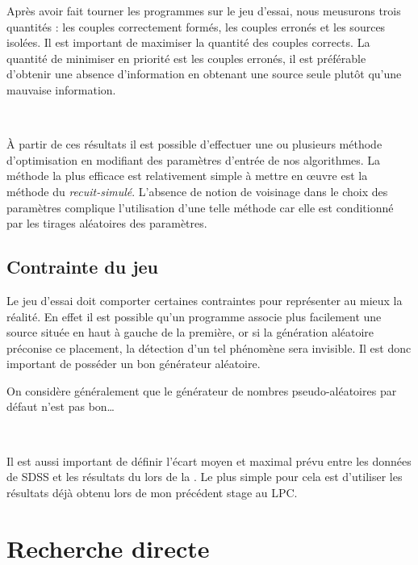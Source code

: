 Après avoir fait tourner les programmes sur le jeu d'essai, nous meusurons trois quantités : les couples correctement formés, les couples erronés et les sources isolées. Il est important de maximiser la quantité des couples corrects. La quantité de minimiser en priorité est les couples erronés, il est préférable d'obtenir une absence d'information en obtenant une source seule plutôt qu'une mauvaise information.

\ 

À partir de ces résultats il est possible d'effectuer une ou plusieurs méthode d'optimisation en modifiant des paramètres d'entrée de nos algorithmes. La méthode la plus efficace est relativement simple à mettre en \oe{}uvre est la méthode du \emph{recuit-simulé}. L'absence de notion de voisinage dans le choix des paramètres complique l'utilisation d'une telle méthode car elle est conditionné par les tirages aléatoires des paramètres.

	\subsection{Contrainte du jeu}

Le jeu d'essai doit comporter certaines contraintes pour représenter au mieux la réalité. En effet il est possible qu'un programme associe plus facilement une source située en haut à gauche de la première, or si la génération aléatoire préconise ce placement, la détection d'un tel phénomène sera invisible. Il est donc important de posséder un bon générateur aléatoire.

On considère généralement que le générateur de nombres pseudo-aléatoires par défaut n'est pas bon\dots

\ 

Il est aussi important de définir l'écart moyen et maximal prévu entre les données de SDSS et les résultats du \stack{} lors de la \DC{}. Le plus simple pour cela est d'utiliser les résultats déjà obtenu lors de mon précédent stage au LPC.


\section{Recherche directe}

